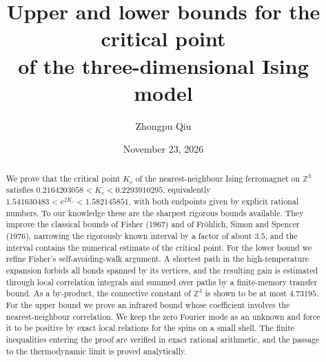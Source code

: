 \documentclass[11pt,reqno]{amsart}
\theoremstyle{plain}
\numberwithin{equation}{section}
\newcommand{\Z}{\mathbb Z}
\begin{document}
\title[Bounds for the critical point of the 3D Ising model]{Upper and lower bounds for the critical point\\ of the three-dimensional Ising model}

\author{Zhongpu Qiu}
\address{Beijing Normal University, Beijing, China; and Shanghai Artificial Intelligence Laboratory, Shanghai, China}

\date{November 23, 2026}


\begin{abstract}
We prove that the critical point $K_c$ of the nearest-neighbour Ising ferromagnet on $\Z^3$ satisfies $0.2164203058<K_c<0.2293910295$, equivalently $1.541630483<e^{2K_c}<1.582145851$, with both endpoints given by explicit rational numbers. To our knowledge these are the sharpest rigorous bounds available. They improve the classical bounds of Fisher (1967) and of Fr\"ohlich, Simon and Spencer (1976), narrowing the rigorously known interval by a factor of about $3.5$, and the interval contains the numerical estimate of the critical point. For the lower bound we refine Fisher's self-avoiding-walk argument. A shortest path in the high-temperature expansion forbids all bonds spanned by its vertices, and the resulting gain is estimated through local correlation integrals and summed over paths by a finite-memory transfer bound. As a by-product, the connective constant of $\Z^3$ is shown to be at most $4.73195$. For the upper bound we prove an infrared bound whose coefficient involves the nearest-neighbour correlation. We keep the zero Fourier mode as an unknown and force it to be positive by exact local relations for the spins on a small shell. The finite inequalities entering the proof are verified in exact rational arithmetic, and the passage to the thermodynamic limit is proved analytically.
\end{abstract}

\maketitle

\setcounter{tocdepth}{1}
\tableofcontents










\appendix



\end{document}
